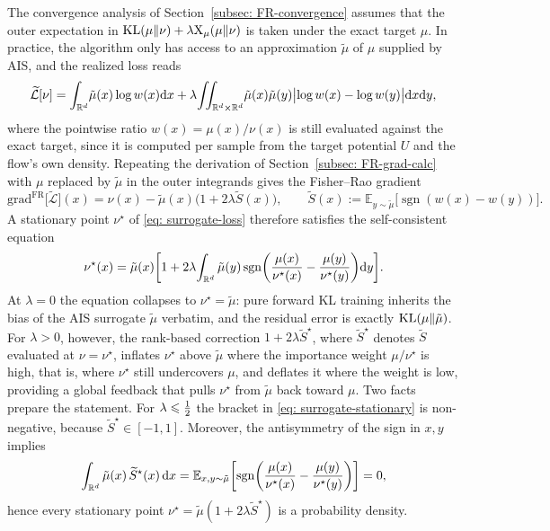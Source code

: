 \documentclass{article}
\begin{document}
The convergence analysis of Section~\ref{subsec: FR-convergence} assumes that the outer expectation in $\mathrm{KL}(\mu\|\nu) + \lambda \mathrm{X}_\mu(\mu\|\nu)$ is taken under the exact target $\mu$. In practice, the algorithm only has access to an approximation $\tilde\mu$ of $\mu$ supplied by AIS, and the realized loss reads
\begin{equation}
    \widetilde{\mathcal L}[\nu]
    = \int_{\mathbb R^d}\!\tilde\mu(x)\log w(x)\mathrm{d} x
    + \lambda\!\iint_{\mathbb R^d\times\mathbb R^d}\!\tilde\mu(x)\tilde\mu(y)\bigl|\log w(x) - \log w(y)\bigr|\mathrm{d} x\mathrm{d} y,
    \label{eq: surrogate-loss}
\end{equation}
where the pointwise ratio $w(x) = \mu(x)/\nu(x)$ is still evaluated against the exact target, since it is computed per sample from the target potential $U$ and the flow's own density. Repeating the derivation of Section~\ref{subsec: FR-grad-calc} with $\mu$ replaced by $\tilde\mu$ in the outer integrands gives the Fisher--Rao gradient
\begin{equation*}
    \mathrm{grad}^{\mathrm{FR}}\bigl[\widetilde{\mathcal L}\bigr](x) = \nu(x) - \tilde\mu(x)\bigl(1 + 2\lambda \widetilde S(x)\bigr),
    \qquad
    \widetilde S(x) := \mathbb E_{y\sim\tilde\mu}\bigl[\operatorname{sgn}(w(x) - w(y))\bigr].
\end{equation*}
A stationary point $\nu^\star$ of \eqref{eq: surrogate-loss} therefore satisfies the self-consistent equation
\begin{equation}
    \nu^\star(x) = \tilde\mu(x)\biggl[1 + 2\lambda\!\int_{\mathbb R^d}\tilde\mu(y)\operatorname{sgn}\biggl(\frac{\mu(x)}{\nu^\star(x)} - \frac{\mu(y)}{\nu^\star(y)}\biggr)\mathrm{d} y\biggr].
    \label{eq: surrogate-stationary}
\end{equation}
At $\lambda = 0$ the equation collapses to $\nu^\star = \tilde\mu$: pure forward KL training inherits the bias of the AIS surrogate $\tilde\mu$ verbatim, and the residual error is exactly $\mathrm{KL}(\mu\|\tilde\mu)$. For $\lambda > 0$, however, the rank-based correction $1 + 2\lambda\widetilde S^\star$, where $\widetilde S^\star$ denotes $\widetilde S$ evaluated at $\nu = \nu^\star$, inflates $\nu^\star$ above $\tilde\mu$ where the importance weight $\mu/\nu^\star$ is high, that is, where $\nu^\star$ still undercovers $\mu$, and deflates it where the weight is low, providing a global feedback that pulls $\nu^\star$ from $\tilde\mu$ back toward $\mu$. Two facts prepare the statement. For $\lambda \leqslant \frac12$ the bracket in \eqref{eq: surrogate-stationary} is non-negative, because $\widetilde S^\star \in [-1, 1]$. Moreover, the antisymmetry of the sign in $x, y$ implies
\begin{equation*}
    \int_{\mathbb R^d} \tilde\mu(x)\, \widetilde S^\star(x)\, \mathrm{d} x
    = \mathbb E_{x, y \sim \tilde\mu}\biggl[\operatorname{sgn}\biggl(\frac{\mu(x)}{\nu^\star(x)} - \frac{\mu(y)}{\nu^\star(y)}\biggr)\biggr] = 0,
\end{equation*}
hence every stationary point $\nu^\star = \tilde\mu(1 + 2\lambda \widetilde S^\star)$ is a probability density.
\end{document}
